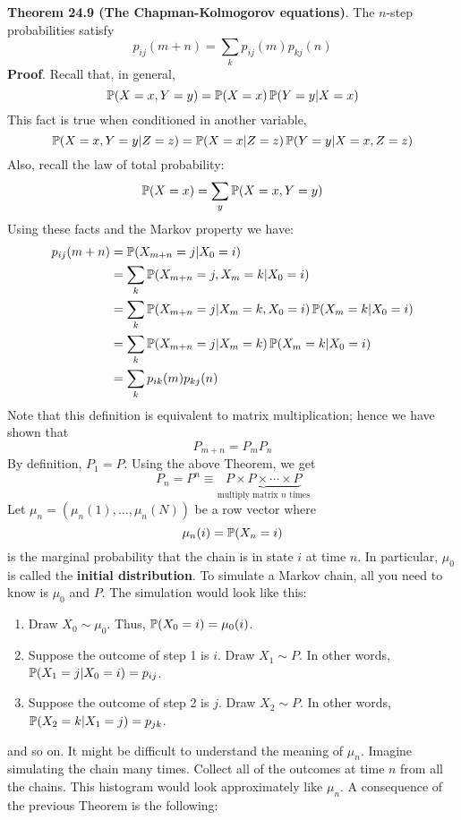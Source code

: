 \textbf{Theorem 24.9 (The Chapman-Kolmogorov equations)}. The \(n\)-step
probabilities satisfy
\[
p_{ij}(m + n) = \sum_{k} p_{ij}(m) p_{kj}(n)
\]
\textbf{Proof}. Recall that, in general,
\[
\operatorname{\mathbb{P}}(X = x, Y = y) = \operatorname{\mathbb{P}}(X = x) \operatorname{\mathbb{P}}(Y = y | X = x)
\]
This fact is true when conditioned in another variable,
\[
\operatorname{\mathbb{P}}(X = x, Y = y | Z = z) = \operatorname{\mathbb{P}}(X = x | Z = z) \operatorname{\mathbb{P}}(Y = y | X = x, Z = z)
\]
Also, recall the law of total probability:
\[
\operatorname{\mathbb{P}}(X = x) = \sum_y \operatorname{\mathbb{P}}(X = x, Y = y)
\]
Using these facts and the Markov property we have:
\begin{align*}
p_{ij}(m + n) &= \operatorname{\mathbb{P}}(X_{m + n} = j | X_{0} = i) \\
&= \sum_{k} \operatorname{\mathbb{P}}(X_{m + n} = j, X_m = k | X_{0} = i) \\
&= \sum_{k} \operatorname{\mathbb{P}}(X_{m + n} = j | X_m = k, X_{0} = i) \operatorname{\mathbb{P}}(X_m = k | X_{0} = i) \\
&= \sum_{k} \operatorname{\mathbb{P}}(X_{m + n} = j | X_m = k) \operatorname{\mathbb{P}}(X_m = k | X_{0} = i) \\
&= \sum_{k} p_{ik}(m) p_{kj}(n)
\end{align*}
Note that this definition is equivalent to matrix multiplication; hence
we have shown that
\[
P_{m + n} = P_m P_{n}
\]
By definition, \(P_{1} = P\). Using the above Theorem, we get
\[
P_{n} = P^{n} \equiv \underbrace{P \times P \times \cdots \times P}_{\text{multiply matrix } n \text{ times}}
\]
Let \(\mu_{n} = (\mu_{n}(1), \dots, \mu_{n}(N))\) be a row vector where
\[
\mu_{n}(i) = \operatorname{\mathbb{P}}(X_{n} = i)
\]
is the marginal probability that the chain is in state \(i\) at time
\(n\). In particular, \(\mu_{0}\) is called the \textbf{initial
distribution}. To simulate a Markov chain, all you need to know is
\(\mu_{0}\) and \(P\). The simulation would look like this:
\begin{enumerate}[tightlist,label={\arabic*.}]
\item
  Draw \(X_{0} \sim \mu_{0}\). Thus, \(\operatorname{\mathbb{P}}(X_{0} = i) = \mu_{0}(i)\).
\item
  Suppose the outcome of step 1 is \(i\). Draw \(X_{1} \sim P\). In other
  words, \(\operatorname{\mathbb{P}}(X_{1} = j | X_{0} = i) = p_{ij}\).
\item
  Suppose the outcome of step 2 is \(j\). Draw \(X_{2} \sim P\). In other
  words, \(\operatorname{\mathbb{P}}(X_{2} = k | X_{1} = j) = p_{jk}\).
\end{enumerate}
and so on.
It might be difficult to understand the meaning of \(\mu_{n}\). Imagine
simulating the chain many times. Collect all of the outcomes at time
\(n\) from all the chains. This histogram would look approximately like
\(\mu_{n}\). A consequence of the previous Theorem is the following:
